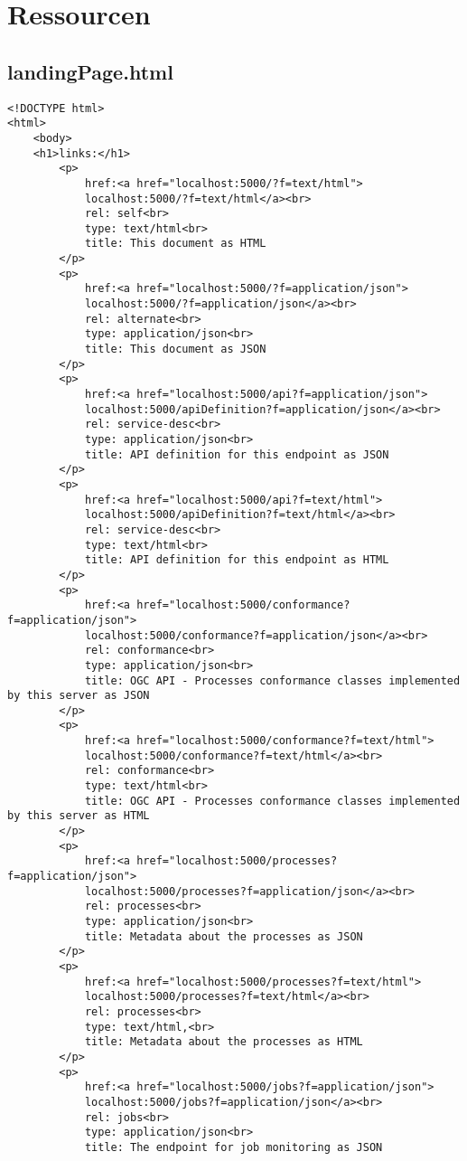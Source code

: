 \section{Ressourcen}
\renewcommand{\lstlistingname}{Ressource}
\subsection{landingPage.html}
\begin{lstlisting}[caption={landingPage.html}, style = HTML]
<!DOCTYPE html>
<html>
	<body>
	<h1>links:</h1>
		<p>
			href:<a href="localhost:5000/?f=text/html">
            localhost:5000/?f=text/html</a><br>
			rel: self<br>
			type: text/html<br>
			title: This document as HTML
		</p>
		<p>
			href:<a href="localhost:5000/?f=application/json">
            localhost:5000/?f=application/json</a><br>
			rel: alternate<br>
			type: application/json<br>
			title: This document as JSON 
		</p>
		<p>
			href:<a href="localhost:5000/api?f=application/json">
            localhost:5000/apiDefinition?f=application/json</a><br>
			rel: service-desc<br>
			type: application/json<br>
			title: API definition for this endpoint as JSON
		</p>
		<p>
			href:<a href="localhost:5000/api?f=text/html">
            localhost:5000/apiDefinition?f=text/html</a><br>
			rel: service-desc<br>
			type: text/html<br>
			title: API definition for this endpoint as HTML
		</p>
		<p>
			href:<a href="localhost:5000/conformance?f=application/json">
            localhost:5000/conformance?f=application/json</a><br>
			rel: conformance<br>
			type: application/json<br>
			title: OGC API - Processes conformance classes implemented by this server as JSON
		</p>
		<p>
			href:<a href="localhost:5000/conformance?f=text/html">
            localhost:5000/conformance?f=text/html</a><br>
			rel: conformance<br>
			type: text/html<br>
			title: OGC API - Processes conformance classes implemented by this server as HTML
		</p>
		<p>
			href:<a href="localhost:5000/processes?f=application/json">
            localhost:5000/processes?f=application/json</a><br>
			rel: processes<br>
			type: application/json<br>
			title: Metadata about the processes as JSON
		</p>
		<p>
			href:<a href="localhost:5000/processes?f=text/html">
            localhost:5000/processes?f=text/html</a><br>
			rel: processes<br>
			type: text/html,<br>
			title: Metadata about the processes as HTML
		</p>
		<p>
			href:<a href="localhost:5000/jobs?f=application/json">
            localhost:5000/jobs?f=application/json</a><br>
			rel: jobs<br>
			type: application/json<br>
			title: The endpoint for job monitoring as JSON

\end{lstlisting}
